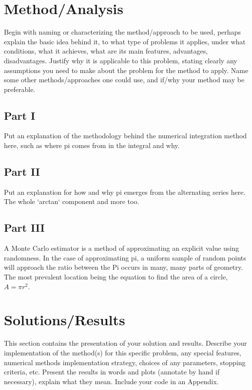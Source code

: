 \documentclass[11pt]{article}
\begin{document}
\section{Method/Analysis}\label{S:3}
Begin with naming or characterizing the method/approach to be used, perhaps explain the basic idea behind it, to what type of problems it applies, under what conditions, what it achieves, what are its main features, advantages, disadvantages. Justify why it is applicable to this problem, stating clearly any assumptions you need to make about the problem for the method to apply. Name some other methods/approaches one could use, and if/why your method may be preferable.

\subsection{Part I}\label{S:3.1}
Put an explanation of the methodology behind the numerical integration method here, such as where pi comes from in the integral and why.

\subsection{Part II}\label{S:3.2}
Put an explanation for how and why pi emerges from the alternating series here. The whole `arctan` component and more too.

\subsection{Part III}\label{S:3.3}
A Monte Carlo estimator is a method of approximating an explicit value using randomness. In the case of approximating pi, a uniform sample of random points will approach the ratio between the
Pi occurs in many, many parts of geometry. The most prevalent location being the equation to find the area of a circle, $A=\pi r^2$.


\section{Solutions/Results}\label{S:4}
This section contains the presentation of your solution and results.
Describe your implementation of the method(s) for this specific problem, any special features, numerical methods implementation  strategy, choices of any parameters, stopping criteria, etc.
Present the results in words and plots (annotate by hand if necessary), explain what they mean. Include your code in an Appendix. 
\end{document}
